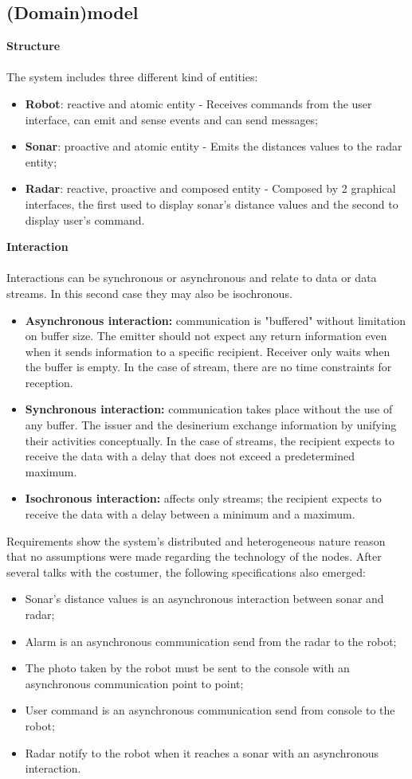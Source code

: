\subsection{(Domain)model}
\textbf{Structure} \\\\
The system includes three different kind of entities:
\begin{itemize}
	\item \textbf{Robot}: reactive and atomic entity - Receives commands from the user interface, can emit and sense events and can send messages;
	\item \textbf{Sonar}: proactive and atomic entity - Emits the distances values to the radar entity;
	\item \textbf{Radar}: reactive, proactive and composed entity - Composed by 2 graphical interfaces, the first used to display sonar's distance values and the second to display user's command.
\end{itemize}
\textbf{Interaction} \\\\
Interactions can be synchronous or asynchronous and relate to data or data streams. In this second case they may also be isochronous. 
\begin{itemize}
	\item \textbf{Asynchronous interaction:} communication is "buffered" without limitation on buffer size. The emitter should not expect any return information even when it sends information to a specific recipient. Receiver only waits when the buffer is empty. In the case of stream, there are no time constraints for reception.
	\item \textbf{Synchronous interaction:} communication takes place without the use of any buffer. The issuer and the desinerium exchange information by unifying their activities conceptually. In the case of streams, the recipient expects to receive the data with a delay that does not exceed a predetermined maximum.
	\item \textbf{Isochronous interaction:} affects only streams; the recipient expects to receive the data with a delay between a minimum and a maximum.
\end{itemize}
Requirements show the system's distributed and heterogeneous nature reason that no assumptions were made regarding the technology of the nodes. After several talks with the costumer, the following specifications also emerged: 
\begin{itemize}
	\item Sonar's distance values is an asynchronous interaction between sonar and radar;
	\item Alarm is an asynchronous communication send from the radar to the robot;
	\item The photo taken by the robot must be sent to the console with an asynchronous communication point to point;
	\item User command is an asynchronous communication send from console to the robot;
	\item Radar notify to the robot when it reaches a sonar with an asynchronous interaction.
\end{itemize}
